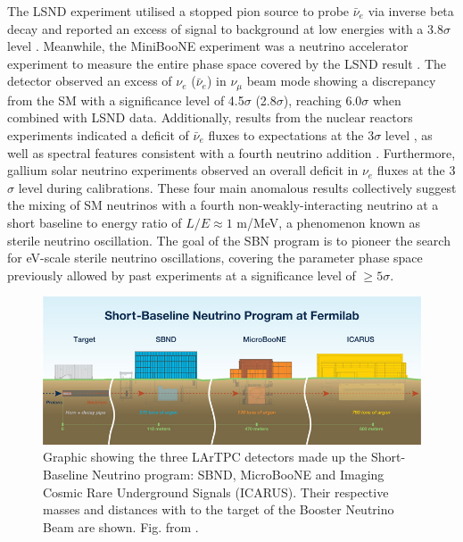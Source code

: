 The LSND experiment utilised a stopped pion source to probe $\bar{\nu}_{e}$ via inverse beta decay and reported an excess of signal to background at low energies with a 3.8$\sigma$ level \cite{LSND_anomaly}. 
Meanwhile, the MiniBooNE experiment was a neutrino accelerator experiment to measure the entire phase space covered by the LSND result \cite{Miniboone_anomaly}.
The detector observed an excess of $\nu_{e}$ ($\bar{\nu}_{e}$) in $\nu_{\mu}$ beam mode showing a discrepancy from the SM with a significance level of 4.5$\sigma$ (2.8$\sigma$), reaching 6.0$\sigma$ when combined with LSND data.
Additionally, results from the nuclear reactors experiments indicated a deficit of $\bar{\nu}_{e}$ fluxes to expectations at the 3$\sigma$ level \cite{reactor_anomaly_1, reactor_anomaly_2}, as well as spectral features consistent with a fourth neutrino addition \cite{reactor_anomaly_3, reactor_anomaly_4}.
Furthermore, gallium solar neutrino experiments observed an overall deficit in $\nu_{e}$ fluxes at the 3$\sigma$ level during calibrations.
These four main anomalous results collectively suggest the mixing of SM neutrinos with a fourth non-weakly-interacting neutrino at a short baseline to energy ratio of $L/E \approx 1 $ m/MeV, a phenomenon known as sterile neutrino oscillation.
The goal of the SBN program is to pioneer the search for eV-scale sterile neutrino oscillations,  covering the parameter phase space previously allowed by past experiments at a significance level of $\geq 5 \sigma$.

\begin{figure}[htbp] 
\centering    
\includegraphics[width=1.0\textwidth]{SBN_program}
\caption[SBN_program]{
Graphic showing the three LArTPC detectors made up the Short-Baseline Neutrino program: SBND, MicroBooNE and Imaging Cosmic Rare Underground Signals (ICARUS).
Their respective masses and distances with to the target of the Booster Neutrino Beam are shown.
Fig. from \cite{SBNProgram}.
}
\label{fig:SBN_program}
\end{figure}


